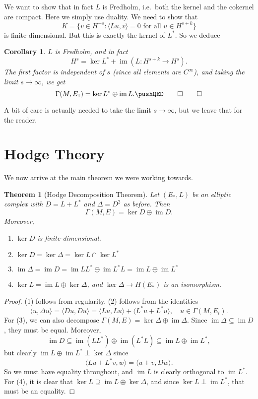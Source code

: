 \documentclass{shortart}
\newtheorem*{thm}{Theorem}
\newtheorem*{cor}{Corollary}
\theoremstyle{definition}
\newcommand\bra\langle
\newcommand\ket\rangle
\DeclareMathOperator\im{im}
\begin{document}
We want to show that in fact $L$ is Fredholm, i.e.\ both the kernel and the cokernel are compact. Here we simply use duality. We need to show that
\[
  K = \{v \in H^{-s} : \bra Lu, v\ket = 0\text{ for all }u \in H^{s + k}\}
\]
is finite-dimensional. But this is exactly the kernel of $L^*$. So we deduce
\begin{cor}
  $L$ is Fredholm, and in fact
  \[
    H^s = \ker L^* + \im (L: H^{s + k} \to H^s).
  \]
  The first factor is independent of $s$ (since all elements are $C^\infty$), and taking the limit $s \to \infty$, we get
  \[
    \Gamma(M, E_1) = \ker L^* \oplus \im L.\fakeqed
  \]
\end{cor}
A bit of care is actually needed to take the limit $s \to \infty$, but we leave that for the reader.
\section{Hodge Theory}
We now arrive at the main theorem we were working towards.
\begin{thm}[Hodge Decomposition Theorem]
  Let $(E_*, L)$ be an elliptic complex with $D = L + L^*$ and $\Delta = D^2$ as before. Then
  \[
    \Gamma(M, E) = \ker D \oplus \im D.
  \]
  Moreover,
  \begin{enumerate}
    \item $\ker D$ is finite-dimensional.
    \item $\ker D = \ker \Delta = \ker L \cap \ker L^*$
    \item $\im \Delta = \im D = \im LL^* \oplus \im L^*L = \im L \oplus \im L^*$
    \item $\ker L = \im L \oplus \ker \Delta$, and $\ker \Delta \to H(E_*)$ is an isomorphism.
  \end{enumerate}
\end{thm}

\begin{proof}
  (1) follows from regularity. (2) follows from the identities
  \[
    \bra u, \Delta u\ket = \bra D u, D u\ket = \bra L u, L u\ket + \bra L^* u + L^* u\ket,\quad u \in \Gamma(M, E_i).
  \]
  For (3), we can also decompose $\Gamma(M, E) = \ker \Delta \oplus \im \Delta$. Since $\im \Delta \subseteq \im D$, they must be equal. Moreover,
  \[
    \im D \subseteq \im(LL^*) \oplus \im (L^*L) \subseteq \im L \oplus \im L^*,
  \]
  but clearly $\im L \oplus \im L^* \perp \ker \Delta$ since
  \[
    \bra L u + L^* v, w\ket = \bra u + v, D w\ket.
  \]
  So we must have equality throughout, and $\im L$ is clearly orthogonal to $\im L^*$. For (4), it is clear that $\ker L \supseteq \im L \oplus \ker \Delta$, and since $\ker L \perp \im L^*$, that must be an equality.
\end{proof}
\end{document}
